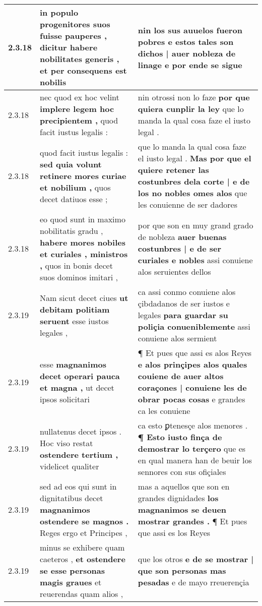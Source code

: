 \begin{tabular}{|p{1cm}|p{6.5cm}|p{6.5cm}|}
2.3.18 & in populo progenitores suos fuisse pauperes , \textbf{ dicitur habere nobilitates generis , } et per consequens est nobilis & nin los sus auuelos fueron pobres \textbf{ e estos tales son dichos | auer nobleza de linage } e por ende se sigue \\\hline
2.3.18 & nec quod ex hoc velint \textbf{ implere legem hoc precipientem , } quod facit iustus legalis : & nin otrossi non lo faze \textbf{ por que quiera cunplir la ley } que lo manda la qual cosa faze el iusto legal . \\\hline
2.3.18 & quod facit iustus legalis : \textbf{ sed quia volunt retinere mores curiae et nobilium , } quos decet datiuos esse ; & que lo manda la qual cosa faze el iusto legal . \textbf{ Mas por que el quiere retener las costunbres dela corte | e de los no nobles omes alos } que les conuienne de ser dadores \\\hline
2.3.18 & eo quod sunt in maximo nobilitatis gradu , \textbf{ habere mores nobiles et curiales , ministros , } quos in bonis decet suos dominos imitari , & por que son en muy grand grado de nobleza \textbf{ auer buenas costunbres | e de ser curiales e nobles } assi conuiene alos seruientes dellos \\\hline
2.3.19 & Nam sicut decet ciues \textbf{ ut debitam politiam seruent } esse iustos legales , & ca assi conmo conuiene alos çibdadanos de ser iustos e legales \textbf{ para guardar su poliçia conueniblemente } assi conuiene alos sermient \\\hline
2.3.19 & esse \textbf{ magnanimos decet operari pauca et magna , } ut decet ipsos solicitari & ¶ Et pues que assi es alos Reyes \textbf{ e alos prinçipes alos quales couiene de auer altos coraçones | conuiene les de obrar pocas cosas } e grandes ca les conuiene \\\hline
2.3.19 & nullatenus decet ipsos . Hoc viso restat \textbf{ ostendere tertium , } videlicet qualiter & ca esto ꝑtenesçe alos menores . \textbf{ ¶ Esto iusto finça de demostrar lo terçero } que es en qual manera han de beuir los sennores con sus ofiçiales \\\hline
2.3.19 & sed ad eos qui sunt in dignitatibus decet \textbf{ magnanimos ostendere se magnos . } Reges ergo et Principes , & mas a aquellos que son en grandes dignidades \textbf{ los magnanimos se deuen mostrar grandes . } ¶ Et pues que assi es los Reyes \\\hline
2.3.19 & minus se exhibere quam caeteros , \textbf{ et ostendere se esse personas magis graues } et reuerendas quam alios , & que los otros \textbf{ e de se mostrar | que son personas mas pesadas } e de mayo rreuerençia \\\hline

\end{tabular}
